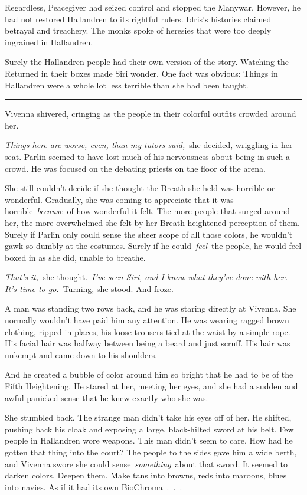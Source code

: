 Regardless, Peacegiver had seized control and stopped the Manywar. However, he had not restored Hallandren to its rightful rulers. Idris’s histories claimed betrayal and treachery. The monks spoke of heresies that were too deeply ingrained in Hallandren.

Surely the Hallandren people had their own version of the story. Watching the Returned in their boxes made Siri wonder. One fact was obvious: Things in Hallandren were a whole lot less terrible than she had been taught.

\bigskip \hrule \bigskip

Vivenna shivered, cringing as the people in their colorful outfits crowded around her.

\textit{Things here are worse, even, than my tutors said,}~she decided, wriggling in her seat. Parlin seemed to have lost much of his nervousness about being in such a crowd. He was focused on the debating priests on the floor of the arena.

She still couldn’t decide if she thought the Breath she held was horrible or wonderful. Gradually, she was coming to appreciate that it was horrible~\textit{because}~of how wonderful it felt. The more people that surged around her, the more overwhelmed she felt by her Breath-heightened perception of them. Surely if Parlin only could sense the sheer scope of all those colors, he wouldn’t gawk so dumbly at the costumes. Surely if he could~\textit{feel}~the people, he would feel boxed in as she did, unable to breathe.

\textit{That’s it,}~she thought.~\textit{I’ve seen Siri, and I know what they’ve done with her. It’s time to go.}~Turning, she stood. And froze.

A man was standing two rows back, and he was staring directly at Vivenna. She normally wouldn’t have paid him any attention. He was wearing ragged brown clothing, ripped in places, his loose trousers tied at the waist by a simple rope. His facial hair was halfway between being a beard and just scruff. His hair was unkempt and came down to his shoulders.

And he created a bubble of color around him so bright that he had to be of the Fifth Heightening. He stared at her, meeting her eyes, and she had a sudden and awful panicked sense that he knew exactly who she was.

She stumbled back. The strange man didn’t take his eyes off of her. He shifted, pushing back his cloak and exposing a large, black-hilted sword at his belt. Few people in Hallandren wore weapons. This man didn’t seem to care. How had he gotten that thing into the court? The people to the sides gave him a wide berth, and Vivenna swore she could sense~\textit{something}~about that sword. It seemed to darken colors. Deepen them. Make tans into browns, reds into maroons, blues into navies. As if it had its own BioChroma~.~.~.


